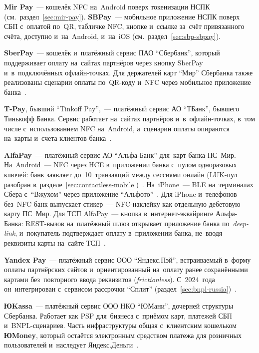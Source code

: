 \textbf{Mir Pay}~--- кошелёк NFC на~Android поверх токенизации НСПК
(см.~раздел~\ref{sec:mir-pay}). \textbf{SBPay}~--- мобильное приложение НСПК
поверх СБП с~оплатой по~QR, табличке NFC, кнопке и~ссылке за~счёт привязанного
счёта, доступно и~на~Android, и~на~iOS (см.~раздел~\ref{sec:sbp-sbpay}).

\textbf{SberPay}~--- кошелёк и~платёжный сервис ПАО \enquote{Сбербанк}, который
поддерживает оплату на~сайтах партнёров через кнопку SberPay и~в~подключённых
офлайн-точках. Для держателей карт \enquote{Мир} Сбербанка также реализованы
сценарии оплаты по~QR-коду и~NFC через мобильное приложение
банка~\cite{sber-pay}.

\textbf{T-Pay}, бывший \enquote{Tinkoff Pay},~--- платёжный сервис АО
\enquote{ТБанк}, бывшего Тинькофф Банка. Сервис работает на~сайтах партнёров
и~в~офлайн-точках, в~том числе с~использованием NFC на~Android, а~сценарии
оплаты опираются на~карты и~счета клиентов банка~\cite{tpay}.

\textbf{AlfaPay}~--- платёжный сервис АО \enquote{Альфа-Банк} для~карт банка
ПС~Мир. На~An\-droid~--- NFC через HCE в~приложении банка с~пулом
одноразовых ключей: банк заявляет до~10~транзакций между сессиями онлайн
(LUK-пул разобран
в~разделе~\ref{sec:contactless-mobile})~\cite{alfa-pay-offline-2025}.
На~iPhone~--- BLE на~терминалах Сбера с~\enquote{Вжухом} через приложение
\enquote{Альфото}~\cite{alfa-iphone-ble-2025}. Для iPhone и~телефонов без~NFC
банк выпускает стикер~--- NFC-наклейку как отдельную дебетовую карту ПС~Мир. Для
ТСП AlfaPay~--- кнопка в~интернет-эквайринге Альфа-Банка: REST-вызов
на~платёжный шлюз открывает приложение банка по~\textit{deep-link},
и~покупатель подтверждает оплату в~приложении банка, не~вводя реквизиты карты
на~сайте ТСП~\cite{alfa-pay-web-api-2025}.

\textbf{Yandex Pay}~--- платёжный сервис ООО \enquote{Яндекс.Пэй}, встраиваемый
в~форму оплаты партнёрских сайтов и~ориентированный на~оплату ранее
сохранёнными картами без~повторного ввода реквизитов (\textit{frictionless}).
С~2024~года он~интегрирован с~сервисом рассрочки \enquote{Сплит}
(раздел~\ref{sec:bnpl-russia})~\cite{yandex-pay,yandex-split}.

\textbf{ЮKassa}~--- платёжный сервис ООО НКО \enquote{ЮМани}, дочерней
структуры Сбербанка. Работает как PSP для~бизнеса с~приёмом карт, платежей СБП
и~BNPL-сценариев. Часть инфраструктуры общая с~клиентским кошельком
\textbf{ЮMoney}, который остаётся электронным средством платежа для розничных
пользователей и~наследует Яндекс.Деньги~\cite{yookassa,yoomoney}.

